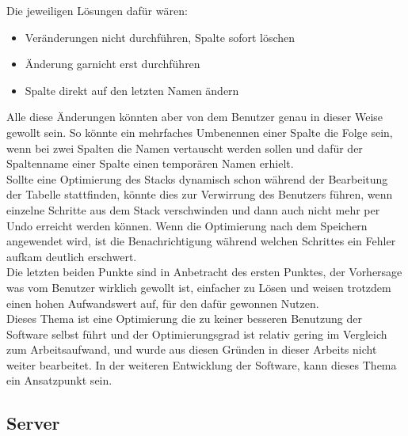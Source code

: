 \begin{description}
Die jeweiligen Lösungen dafür wären:
\begin{itemize}
    \item Veränderungen nicht durchführen, Spalte sofort löschen
    \item Änderung garnicht erst durchführen
    \item Spalte direkt auf den letzten Namen ändern
\end{itemize}

Alle diese Änderungen könnten aber von dem Benutzer genau in dieser Weise gewollt sein. So könnte ein mehrfaches Umbenennen einer Spalte die Folge sein, wenn bei zwei Spalten die Namen vertauscht werden sollen und dafür der Spaltenname einer Spalte einen temporären Namen erhielt. \\
Sollte eine Optimierung des Stacks dynamisch schon während der Bearbeitung der Tabelle stattfinden, könnte dies zur Verwirrung des Benutzers führen, wenn einzelne Schritte aus dem Stack verschwinden und dann auch nicht mehr per Undo erreicht werden können.
Wenn die Optimierung nach dem Speichern angewendet wird, ist die Benachrichtigung während welchen Schrittes ein Fehler aufkam deutlich erschwert. \\
Die letzten beiden Punkte sind in Anbetracht des ersten Punktes, der Vorhersage was vom Benutzer wirklich gewollt ist, einfacher zu Lösen und weisen trotzdem einen hohen Aufwandswert auf, für den dafür gewonnen Nutzen. \\
Dieses Thema ist eine Optimierung die zu keiner besseren Benutzung der Software selbst führt und der Optimierungsgrad ist relativ gering im Vergleich zum Arbeitsaufwand, und wurde aus diesen Gründen in dieser Arbeits nicht weiter bearbeitet. In der weiteren Entwicklung der Software, kann dieses Thema ein Ansatzpunkt sein. 
\end{description}




\newpage
\subsection{Server}
\label{subsec04:server}
%

